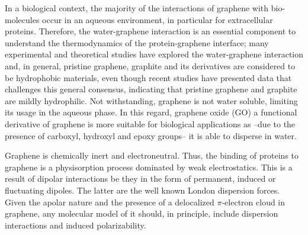 \documentclass[journal=jcisd8,manuscript=article,layout=twocolumn]{achemso}
\begin{document}
In a biological context, the majority of the interactions of graphene with bio-molecules occur in an aqueous environment, in particular for extracellular proteins.
Therefore, the water-graphene interaction is an essential component to understand the thermodynamics of the protein-graphene interface; many experimental and theoretical studies have explored the water-graphene interaction and, in general, pristine graphene, graphite and its derivatives are considered to be hydrophobic materials, \cite{Shih2012,Rafiee2012,Taherian2013} even though recent studies have presented data that challenges this general consensus, indicating that pristine graphene and graphite are mildly hydrophilic. \citep{Li2013,Ashraf2014,Mucksch2015,Parobek2015,Hong2016,Kozbial2017,Prydatko2018}
Not withstanding, graphene is not water soluble, limiting its usage in the aqueous phase.
In this regard, graphene oxide (GO) a functional derivative of graphene is more suitable for biological applications as --due to the presence of carboxyl, hydroxyl and epoxy groups-- it is able to disperse in water. \cite{Gomez-Navarro2010,Rhazouani2021}

Graphene is chemically inert and electroneutral. \cite{Eftekhari_2017}
Thus, the binding of proteins to graphene is a physisorption process dominated by weak electrostatics.
This is a result of dipolar interactions be they in the form of permanent, induced or fluctuating dipoles.
The latter are the well known London dispersion forces.
Given the apolar nature and the presence of a delocalized $\pi$-electron cloud in graphene, any molecular model of it should, in principle, include dispersion interactions and induced polarizability. \cite{Hong2016}
\end{document}
